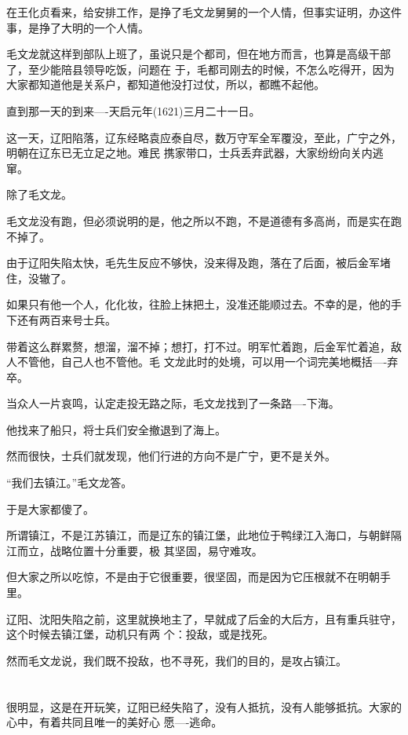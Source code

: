 \documentclass[11pt,a4paper,onecolumn]{article}
\begin{document}
在王化贞看来，给安排工作，是挣了毛文龙舅舅的一个人情，但事实证明，办这件事，是挣了大明的一个人情。

毛文龙就这样到部队上班了，虽说只是个都司，但在地方而言，也算是高级干部了，至少能陪县领导吃饭，问题在
于，毛都司刚去的时候，不怎么吃得开，因为大家都知道他是关系户，都知道他没打过仗，所以，都瞧不起他。

直到那一天的到来----天启元年(1621)三月二十一日。

这一天，辽阳陷落，辽东经略袁应泰自尽，数万守军全军覆没，至此，广宁之外，明朝在辽东已无立足之地。难民
携家带口，士兵丢弃武器，大家纷纷向关内逃窜。

除了毛文龙。

毛文龙没有跑，但必须说明的是，他之所以不跑，不是道德有多高尚，而是实在跑不掉了。

由于辽阳失陷太快，毛先生反应不够快，没来得及跑，落在了后面，被后金军堵住，没辙了。

如果只有他一个人，化化妆，往脸上抹把土，没准还能顺过去。不幸的是，他的手下还有两百来号士兵。

带着这么群累赘，想溜，溜不掉；想打，打不过。明军忙着跑，后金军忙着追，敌人不管他，自己人也不管他。毛
文龙此时的处境，可以用一个词完美地概括----弃卒。

当众人一片哀鸣，认定走投无路之际，毛文龙找到了一条路----下海。

他找来了船只，将士兵们安全撤退到了海上。

然而很快，士兵们就发现，他们行进的方向不是广宁，更不是关外。

``我们去镇江。''毛文龙答。

于是大家都傻了。

所谓镇江，不是江苏镇江，而是辽东的镇江堡，此地位于鸭绿江入海口，与朝鲜隔江而立，战略位置十分重要，极
其坚固，易守难攻。

但大家之所以吃惊，不是由于它很重要，很坚固，而是因为它压根就不在明朝手里。

辽阳、沈阳失陷之前，这里就换地主了，早就成了后金的大后方，且有重兵驻守，这个时候去镇江堡，动机只有两
个：投敌，或是找死。

然而毛文龙说，我们既不投敌，也不寻死，我们的目的，是攻占镇江。

\section[\thesection]{}

很明显，这是在开玩笑，辽阳已经失陷了，没有人抵抗，没有人能够抵抗。大家的心中，有着共同且唯一的美好心
愿----逃命。
\end{document}
